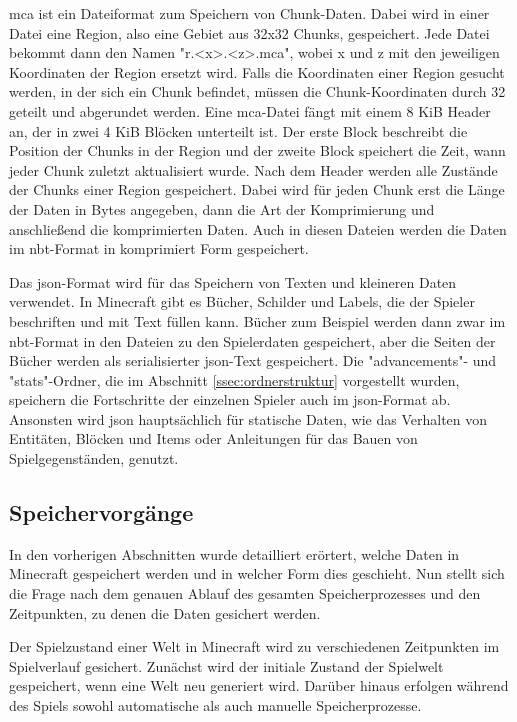 \ac{mca} ist ein Dateiformat zum Speichern von Chunk-Daten. Dabei wird in einer Datei eine Region, also eine Gebiet aus 32x32 Chunks, gespeichert. Jede Datei bekommt dann den Namen "r.<x>.<z>.mca", wobei x und z mit den jeweiligen Koordinaten der Region ersetzt wird. Falls die Koordinaten einer Region gesucht werden, in der sich ein Chunk befindet, müssen die Chunk-Koordinaten durch 32 geteilt und abgerundet werden. Eine \ac{mca}-Datei fängt mit einem 8 KiB Header an, der in zwei 4 KiB Blöcken unterteilt ist. Der erste Block beschreibt die Position der Chunks in der Region und der zweite Block speichert die Zeit, wann jeder Chunk zuletzt aktualisiert wurde. Nach dem Header werden alle Zustände der Chunks einer Region gespeichert. Dabei wird für jeden Chunk erst die Länge der Daten in Bytes angegeben, dann die Art der Komprimierung und anschließend die komprimierten Daten.\cite{minecraftRegionFile}\cite{minecraftAnvilFile} Auch in diesen Dateien werden die Daten im \ac{nbt}-Format in komprimiert Form gespeichert.\cite{minecraftNBT}

Das \ac{json}-Format wird für das Speichern von Texten und kleineren Daten verwendet. In Minecraft gibt es Bücher, Schilder und Labels, die der Spieler beschriften und mit Text füllen kann. Bücher zum Beispiel werden dann zwar im \ac{nbt}-Format in den Dateien zu den Spielerdaten gespeichert, aber die Seiten der Bücher werden als serialisierter \ac{json}-Text gespeichert.\cite{minecraftPlayerdatFormat} Die "advancements"- und "stats"-Ordner, die im Abschnitt \ref{ssec:ordnerstruktur} vorgestellt wurden, speichern die Fortschritte der einzelnen Spieler auch im \ac{json}-Format ab. Ansonsten wird \ac{json} hauptsächlich für statische Daten, wie das Verhalten von Entitäten, Blöcken und Items oder Anleitungen für das Bauen von Spielgegenständen, genutzt.\cite{minecraftJSON}


\subsection{Speichervorgänge}
In den vorherigen Abschnitten wurde detailliert erörtert, welche Daten in Minecraft gespeichert werden und in welcher Form dies geschieht. Nun stellt sich die Frage nach dem genauen Ablauf des gesamten Speicherprozesses und den Zeitpunkten, zu denen die Daten gesichert werden.

Der Spielzustand einer Welt in Minecraft wird zu verschiedenen Zeitpunkten im Spielverlauf gesichert. Zunächst wird der initiale Zustand der Spielwelt gespeichert, wenn eine Welt neu generiert wird. Darüber hinaus erfolgen während des Spiels sowohl automatische als auch manuelle Speicherprozesse.\cite{minecraftSpielstandSpeicherung}

